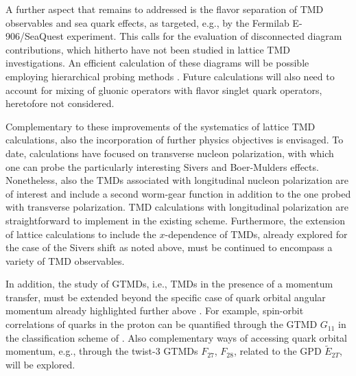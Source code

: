 A further aspect that remains to addressed is the flavor separation
of TMD observables and sea quark effects, as targeted, e.g., by the Fermilab
E-906/SeaQuest experiment. This calls for the evaluation of disconnected
diagram contributions, which hitherto have not been studied in lattice TMD
investigations. An efficient calculation of these diagrams will be possible
employing hierarchical probing methods \cite{Stathopoulos:2013aci}.
Future calculations will also need to account for mixing of gluonic
operators with flavor singlet quark operators, heretofore not considered.

Complementary to these improvements of the systematics of lattice TMD
calculations, also the incorporation of further physics objectives is
envisaged. To date, calculations have focused on transverse nucleon
polarization, with which one can probe the particularly interesting
Sivers and Boer-Mulders effects. Nonetheless, also the TMDs associated
with longitudinal nucleon polarization are of interest and include a
second worm-gear function in addition to the one probed with transverse
polarization. TMD calculations with longitudinal polarization are
straightforward to implement in the existing scheme. Furthermore, the
extension of lattice calculations to include the $x$-dependence of TMDs,
already explored for the case of the Sivers shift as noted above, must be
continued to encompass a variety of TMD observables.

In addition, the study of GTMDs, i.e., TMDs in the presence of a
momentum transfer, must be extended beyond the specific case of quark
orbital angular momentum already highlighted further above
\cite{Engelhardt:2017miy}. For example, spin-orbit correlations of quarks
in the proton can be quantified through the GTMD $G_{11} $ in the
classification scheme of \cite{Meissner:2009ww}.
Also complementary ways of accessing quark orbital
momentum, e.g., through the twist-3 GTMDs $F_{27} $, $F_{28} $, related
to the GPD $\widetilde{E}_{2T} $, will be explored.











